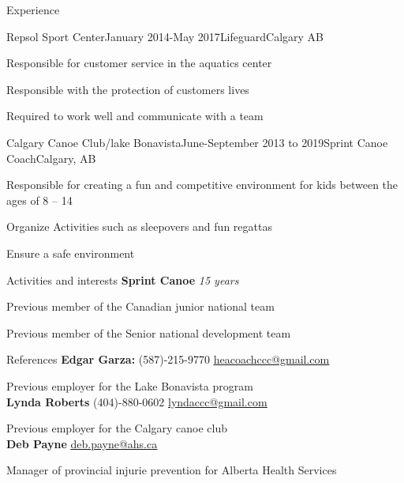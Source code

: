 \documentclass{resume}
\begin{document}
\begin{rSection}{Experience}

	\begin{rSubsection}{Repsol Sport Center}{January 2014-May 2017}{Lifeguard}{Calgary AB}
	\item Responsible for customer service in the aquatics center 
	\item Responsible with the protection of customers lives
	\item Required to work well and communicate with a team
	\end{rSubsection}

	\begin{rSubsection}{Calgary Canoe Club/lake Bonavista}{June-September 2013 to 2019}{Sprint Canoe Coach}{Calgary, AB}
	\item Responsible for creating a fun and competitive environment for kids between the ages of 8 -- 14
	\item Organize Activities such as sleepovers and fun regattas 
	\item Ensure a safe environment
	\end{rSubsection}

\end{rSection}

\begin{rSection}{Activities and interests}
	{\bf Sprint Canoe} {\em 15 years}
\item {Previous member of the Canadian junior national team}
\item {Previous member of the Senior national development team}
\end{rSection}

\begin{rSection}{References}
	{\bf Edgar Garza:} {(587)-215-9770} \underline{\href{mailto:heacoachccc@gmail.com}{heacoachccc@gmail.com}}
\item Previous employer for the Lake Bonavista program\\

	{\bf Lynda Roberts}  {(404)-880-0602 } \underline{\href{mailto:lyndaccc@gmail.com}{lyndaccc@gmail.com}}
\item Previous employer for the Calgary canoe club\\

	{\bf Deb Payne} \underline{\href{mailto:deb.payne@ahs.ca}{deb.payne@ahs.ca}}
\item Manager of provincial injurie prevention for Alberta Health Services\\
\end{rSection}
\end{document}
